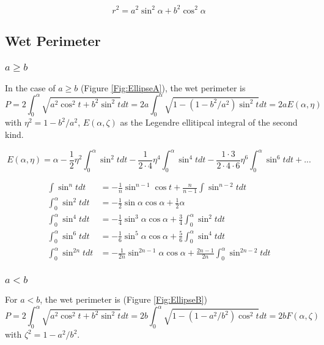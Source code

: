 \begin{equation}
r^2 = a^2\sin^2\alpha + b^2\cos^2\alpha
\end{equation}

\subsection{Wet Perimeter}
\subsubsection{$a \ge b$}
In the case of $a \ge b$ (Figure \ref{Fig:EllipseA}), the wet perimeter is
\begin{equation}
P =  2\int _0 ^{\alpha } \sqrt{a^2\cos^2t + b^2\sin^2t} dt =2 a\int _0 ^{\alpha } \sqrt{1 - \left(1 - b^2/a^2\right) \sin^2t} dt =  2aE(\alpha, \eta)
\end{equation}
with $\eta^2 = 1 - b^2/a^2$,  $E(\alpha, \zeta)$ as the Legendre ellitipcal integral of the second kind.

\begin{equation}
E(\alpha, \eta) = \alpha -\frac{1}{2}\eta^2\int_0^\alpha \sin^2 tdt - \frac{1}{2 \cdot 4}\eta^4\int_0^\alpha \sin^4 tdt - \frac{1 \cdot 3}{2 \cdot 4 \cdot 6}\eta^6\int_0^\alpha \sin^6 tdt + ...
\end{equation}

\begin{equation}
\begin{aligned}
\int \sin^n t dt &= -\frac{1}{n} \sin^{n-1} \cos t + \frac{n}{n-1} \int \sin^{n-2} t dt \\
\int_0^\alpha \sin^2 tdt &=  -\frac{1}{2}\sin \alpha \cos\alpha + \frac{1}{2}\alpha \\
\int_0^\alpha \sin^4 t dt &= -\frac{1}{4}\sin^3 \alpha  \cos \alpha + \frac{3}{4} \int_0^\alpha \sin^2 t dt \\
\int_0^\alpha \sin^6 t dt &= -\frac{1}{6}\sin^5 \alpha  \cos \alpha + \frac{5}{6} \int_0^\alpha \sin^4 t dt \\
\int_0^\alpha \sin^{2n} t dt &= -\frac{1}{2n}\sin^{2n-1} \alpha  \cos \alpha + \frac{2n-1}{2n} \int_0^\alpha \sin^{2n-2} t dt 
\end{aligned}
\end{equation}

\subsubsection{$a < b$}

For $a < b$, the wet perimeter is (Figure \ref{Fig:EllipseB})
\begin{equation}
P =  2\int _0 ^{\alpha } \sqrt{a^2\cos^2t + b^2\sin^2t} dt = 2b\int _0 ^{\alpha } \sqrt{1 - \left(1 - a^2/b^2\right) \cos^2t} dt =  2bF(\alpha, \zeta)
\end{equation}
with $\zeta^2 = 1 - a^2/b^2$.


